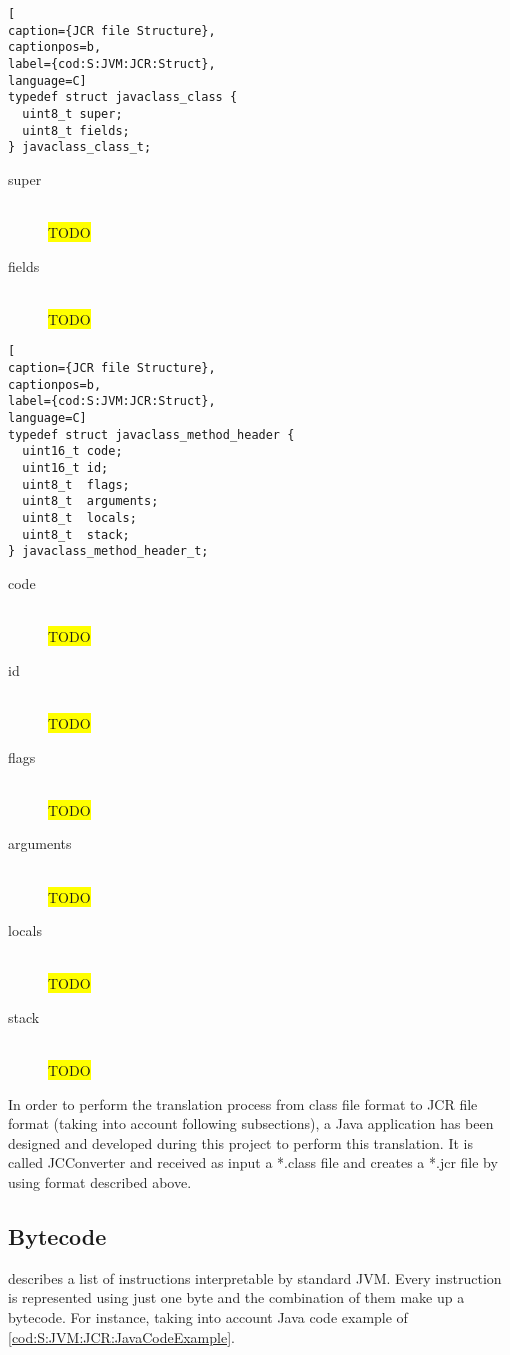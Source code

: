 \begin{lstlisting}[
caption={JCR file Structure},
captionpos=b,
label={cod:S:JVM:JCR:Struct},
language=C]
typedef struct javaclass_class {
  uint8_t super;
  uint8_t fields;
} javaclass_class_t;
\end{lstlisting}

\begin{description}
\item[super] \hfill \\
\colorbox{yellow}{TODO}
\item[fields] \hfill \\
\colorbox{yellow}{TODO}
\end{description}

\begin{lstlisting}[
caption={JCR file Structure},
captionpos=b,
label={cod:S:JVM:JCR:Struct},
language=C]
typedef struct javaclass_method_header {
  uint16_t code;
  uint16_t id;
  uint8_t  flags;
  uint8_t  arguments;
  uint8_t  locals;
  uint8_t  stack;
} javaclass_method_header_t;
\end{lstlisting}

\begin{description}
\item[code] \hfill \\
\colorbox{yellow}{TODO}
\item[id] \hfill \\
\colorbox{yellow}{TODO}
\item[flags] \hfill \\
\colorbox{yellow}{TODO}
\item[arguments] \hfill \\
\colorbox{yellow}{TODO}
\item[locals] \hfill \\
\colorbox{yellow}{TODO}
\item[stack] \hfill \\
\colorbox{yellow}{TODO}
\end{description}

In order to perform the translation process from class file format to JCR file format (taking into account following subsections), a Java application has been designed and developed during this project to perform this translation. It is called JCConverter and received as input a *.class file and creates a *.jcr file by using format described above.

\subsection{Bytecode}\label{SS:JVM:JCR:Bytecode}
\cite{Art:JVMSE7} describes a list of instructions interpretable by standard JVM. Every instruction is represented using just one byte and the combination of them make up a bytecode. For instance, taking into account Java code example of \ref{cod:S:JVM:JCR:JavaCodeExample}.

